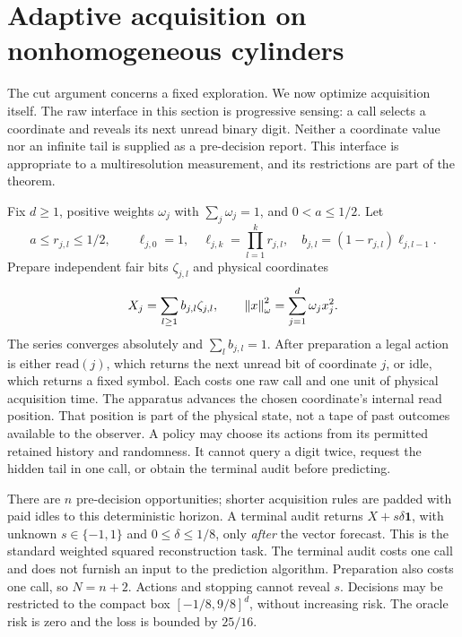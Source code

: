 \section{Adaptive acquisition on nonhomogeneous cylinders}\label{sec:adaptive}
The cut argument concerns a fixed exploration. We now optimize acquisition itself. The raw interface in this section is progressive sensing: a call selects a coordinate and reveals its next unread binary digit. Neither a coordinate value nor an infinite tail is supplied as a pre-decision report. This interface is appropriate to a multiresolution measurement, and its restrictions are part of the theorem.

Fix $d\ge1$, positive weights $\omega_j$ with $\sum_j\omega_j=1$, and $0<a\le1/2$. Let
\begin{equation}\label{eq:scales}
 a\le r_{j,l}\le1/2,\qquad
 \ell_{j,0}=1,\quad \ell_{j,k}=\prod_{l=1}^k r_{j,l},\quad
 b_{j,l}=(1-r_{j,l})\ell_{j,l-1}.
\end{equation}
Prepare independent fair bits $\zeta_{j,l}$ and physical coordinates
\begin{equation}\label{eq:cylinders}
 X_j=\sum_{l\ge1}b_{j,l}\zeta_{j,l},\qquad
 \left\lVert x\right\rVert_\omega^2=\sum_{j=1}^d\omega_jx_j^2.
\end{equation}
The series converges absolutely and $\sum_l b_{j,l}=1$. After preparation a legal action is either $\mathrm{read}(j)$, which returns the next unread bit of coordinate $j$, or $\mathrm{idle}$, which returns a fixed symbol. Each costs one raw call and one unit of physical acquisition time. The apparatus advances the chosen coordinate's internal read position. That position is part of the physical state, not a tape of past outcomes available to the observer. A policy may choose its actions from its permitted retained history and randomness. It cannot query a digit twice, request the hidden tail in one call, or obtain the terminal audit before predicting.

There are $n$ pre-decision opportunities; shorter acquisition rules are padded with paid idles to this deterministic horizon. A terminal audit returns $X+s\delta\mathbf 1$, with unknown $s\in\{-1,1\}$ and $0\le\delta\le1/8$, only \emph{after} the vector forecast. This is the standard weighted squared reconstruction task. The terminal audit costs one call and does not furnish an input to the prediction algorithm. Preparation also costs one call, so $N=n+2$. Actions and stopping cannot reveal $s$. Decisions may be restricted to the compact box $[-1/8,9/8]^d$, without increasing risk. The oracle risk is zero and the loss is bounded by $25/16$.

